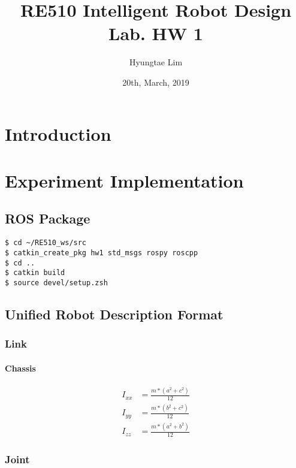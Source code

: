 \documentclass{article}
\title{RE510 Intelligent Robot Design Lab. HW 1}
\author{Hyungtae Lim}
\date{20th, March, 2019}
\begin{document}
\maketitle


\section{Introduction}

\section{Experiment Implementation}

\subsection{ROS Package}

\begin{lstlisting}[frame=single]
$ cd ~/RE510_ws/src
$ catkin_create_pkg hw1 std_msgs rospy roscpp
$ cd ..
$ catkin build
$ source devel/setup.zsh

\end{lstlisting}

\subsection{Unified Robot Description Format}

\subsubsection{Link}

\paragraph{Chassis}

\begin{align}
I_{xx} & =\frac{m*(a^2 + c^2)}{12} \\ 
I_{yy} & =\frac{m*(b^2 + c^2)}{12} \\
I_{zz} & =\frac{m*(a^2 + b^2)}{12} 
\end{align}

\subsubsection{Joint}
\end{document}

